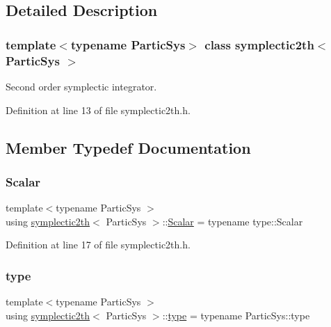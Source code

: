 \subsection{Detailed Description}
\subsubsection*{template$<$typename Partic\+Sys$>$\newline
class symplectic2th$<$ Partic\+Sys $>$}

Second order symplectic integrator. 

Definition at line 13 of file symplectic2th.\+h.



\subsection{Member Typedef Documentation}
\mbox{\label{classsymplectic2th_a801a87947fe8e90ee68759952c937ed5}} 
\subsubsection{\texorpdfstring{Scalar}{Scalar}}
{\footnotesize\ttfamily template$<$typename Partic\+Sys $>$ \\
using \mbox{\hyperlink{classsymplectic2th}{symplectic2th}}$<$ Partic\+Sys $>$\+::\mbox{\hyperlink{classsymplectic2th_a801a87947fe8e90ee68759952c937ed5}{Scalar}} =  typename type\+::\+Scalar}



Definition at line 17 of file symplectic2th.\+h.

\mbox{\label{classsymplectic2th_a88bc0c031313c7752d9891c927641b9f}} 
\subsubsection{\texorpdfstring{type}{type}}
{\footnotesize\ttfamily template$<$typename Partic\+Sys $>$ \\
using \mbox{\hyperlink{classsymplectic2th}{symplectic2th}}$<$ Partic\+Sys $>$\+::\mbox{\hyperlink{classsymplectic2th_a88bc0c031313c7752d9891c927641b9f}{type}} =  typename Partic\+Sys\+::type}




